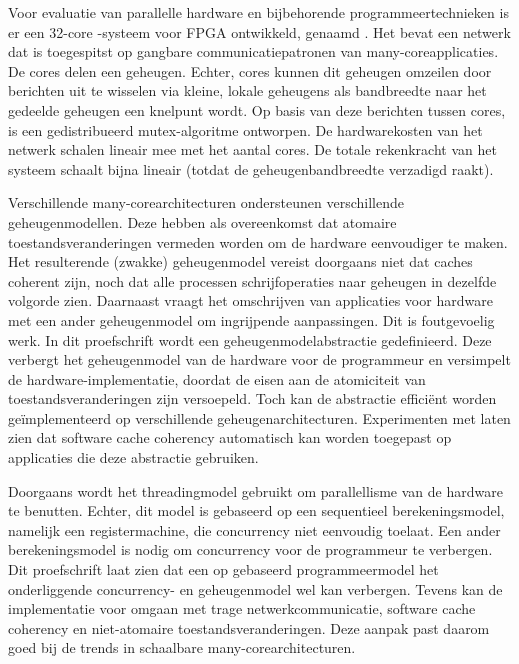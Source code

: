 Voor evaluatie van parallelle hardware en bijbehorende programmeertechnieken is er een 32-core \MicroBlaze-systeem voor \ac{FPGA} ontwikkeld, genaamd \Starburst.
Het bevat een netwerk dat is toegespitst op gangbare communicatiepatronen van many-core\-applicaties.
De cores delen een geheugen. Echter, cores kunnen dit geheugen omzeilen door berichten uit te wisselen via kleine, lokale geheugens als bandbreedte naar het gedeelde geheugen een knelpunt wordt.
Op basis van deze berichten tussen cores, is een gedistribueerd mutex-algoritme ontworpen.
De hardwarekosten van het netwerk schalen lineair mee met het aantal cores. De totale rekenkracht van het systeem schaalt bijna lineair (totdat de geheugenbandbreedte verzadigd raakt).

Verschillende many-core\-architecturen ondersteunen verschillende geheugenmodellen.
Deze hebben als overeenkomst dat atomaire toestandsveranderingen vermeden worden om de hardware eenvoudiger te maken.
Het resulterende (zwakke) geheugenmodel vereist doorgaans niet dat caches coherent zijn, noch dat alle processen schrijfoperaties naar geheugen in dezelfde volgorde zien.
Daarnaast vraagt het omschrijven van applicaties voor hardware met een ander geheugenmodel om ingrijpende aanpassingen. Dit is foutgevoelig werk.
In dit proefschrift wordt een geheugenmodelabstractie gedefinieerd. Deze verbergt het geheugenmodel van de hardware voor de programmeur en versimpelt de hardware-implementatie, doordat de eisen aan de atomiciteit van toestandsveranderingen zijn versoepeld. Toch kan de abstractie effici\"ent worden ge\"implementeerd op verschillende geheugenarchitecturen.
Experimenten met \Starburst laten zien dat software cache coherency automatisch kan worden toegepast op applicaties die deze abstractie gebruiken.

Doorgaans wordt het threadingmodel gebruikt om parallellisme van de hardware te benutten.
Echter, dit model is gebaseerd op een sequentieel berekeningsmodel, namelijk een registermachine, die concurrency niet eenvoudig toelaat.
Een ander berekeningsmodel is nodig om concurrency voor de programmeur te verbergen.
Dit proefschrift laat zien dat een op \lcalc gebaseerd programmeermodel het onderliggende concurrency- en geheugenmodel wel kan verbergen.
Tevens kan de implementatie voor \Starburst omgaan met trage netwerkcommunicatie, software cache coherency en niet-atomaire toestandsveranderingen.
Deze aanpak past daarom goed bij de trends in schaalbare many-core\-architecturen.


